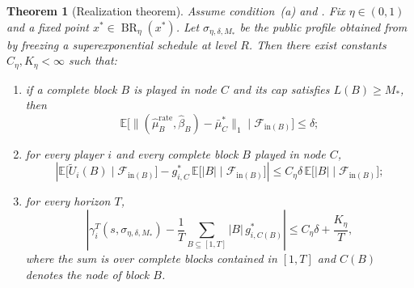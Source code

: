 \documentclass[12pt]{article}
\newtheorem{theorem}{Theorem}[section]
\theoremstyle{definition}
\newcommand{\E}{\mathbb{E}}
\newcommand{\1}{\mathbf{1}}
\newcommand{\cF}{\mathcal{F}}
\DeclareMathOperator{\BR}{BR}
\begin{document}
\begin{theorem}[Realization theorem]
\label{thm:realization}
Assume condition~\textnormal{(a)} and . Fix
$\eta\in(0,1)$ and a fixed point $x^*\in\BR_\eta(x^*)$. Let
$\sigma_{\eta,\delta,M_*}$ be the public profile obtained from
 by freezing a superexponential schedule at level $R$.
Then there exist constants $C_\eta,K_\eta<\infty$ such that:
\begin{enumerate}[label=\textnormal{(Q\arabic*)},leftmargin=2.8em]
\item if a complete block $B$ is played in node $C$ and its cap satisfies
$L(B)\ge M_*$, then
\begin{equation}
\label{eq:block-occupation-realization}
\E\bigl[\|(\widehat\mu_B^{\mathrm{rate}},\widehat\beta_B)-\bar\mu_C^*\|_1
\mid \cF_{\mathrm{in}(B)}\bigr]
\le \delta;
\end{equation}
\item for every player $i$ and every complete block $B$ played in node $C$,
\begin{equation}
\label{eq:block-payoff-realization}
\left|
\E\bigl[\widetilde U_i(B)\mid \cF_{\mathrm{in}(B)}\bigr]
-
g_{i,C}^*\,\E\bigl[|B|\mid \cF_{\mathrm{in}(B)}\bigr]
\right|
\le C_\eta\delta\,\E\bigl[|B|\mid \cF_{\mathrm{in}(B)}\bigr];
\end{equation}
\item for every horizon $T$,
\begin{equation}
\label{eq:realization-tail-bound}
\left|
\gamma_i^T(s,\sigma_{\eta,\delta,M_*})
-
\frac1T\sum_{B\subseteq [1,T]} |B|\,g_{i,C(B)}^*
\right|
\le C_\eta\delta + \frac{K_\eta}{T},
\end{equation}
where the sum is over complete blocks contained in $[1,T]$ and $C(B)$ denotes the
node of block $B$.
\end{enumerate}
\end{theorem}
\end{document}
